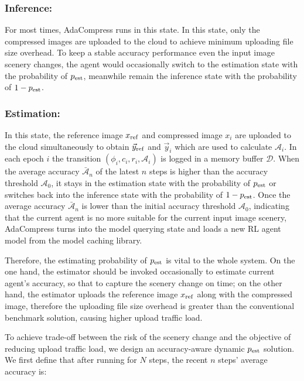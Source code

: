 \subsubsection{\textbf{Inference:}}

For most times, AdaCompress runs in this state. In this state, only the compressed images are uploaded to the cloud to achieve minimum uploading file size overhead. To keep a stable accuracy performance even the input image scenery changes, the agent would occasionally switch to the estimation state with the probability of $ p_{\rm est} $, meanwhile remain the inference state with the probability of $ 1 - p_{\rm est} $. %

\subsubsection{\textbf{Estimation:}}

In this state, the reference image $ x_{\rm ref} $ and compressed image $ x_i $ are uploaded to the cloud simultaneously to obtain $ \vec{y}_{\rm ref} $ and $ \vec{y}_i $ which are used to calculate $ \mathcal{A}_i $. In each epoch $ i $ the transition $ (\phi_i, c_i, r_i, \mathcal{A}_i) $ is logged in a memory buffer $ \mathcal{D} $. When the average accuracy $ \bar{\mathcal{A}}_n $ of the latest $ n $ steps is higher than the accuracy threshold $ \mathcal{A}_0 $, it stays in the estimation state with the probability of $ p_{\rm est} $ or switches back into the inference state with the probability of $ 1 - p_{\rm est} $. Once the average accuracy $ \bar{\mathcal{A}}_n $ is lower than the initial accuracy threshold $ \mathcal{A}_0 $, indicating that the current agent is no more suitable for the current input image scenery, AdaCompress turns into the model querying state and loads a new RL agent model from the model caching library. %

Therefore, the estimating probability of $ p_{\rm est} $ is vital to the whole system. On the one hand, the estimator should be invoked occasionally to estimate current agent's accuracy, so that to capture the scenery change on time; on the other hand, the estimator uploads the reference image $ x_{\rm ref} $ along with the compressed image, therefore the uploading file size overhead is greater than the conventional benchmark solution, causing higher upload traffic load. %

To achieve trade-off between the risk of the scenery change and the objective of reducing upload traffic load, we design an accuracy-aware dynamic $ p_{\rm est} $ solution. We first define that after running for $ N $ steps, the recent $ n $ steps' average accuracy is: 

